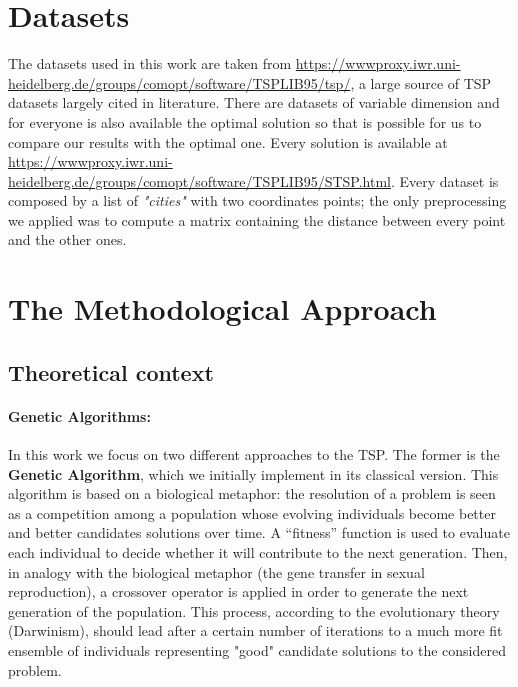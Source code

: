 \section{Datasets}
The datasets used in this work are taken from  \url{https://wwwproxy.iwr.uni-heidelberg.de/groups/comopt/software/TSPLIB95/tsp/}, a large source of TSP datasets largely cited in literature. 
There are datasets of variable dimension and for everyone is also available the optimal solution so that is possible for us to compare our results with the optimal one.
Every solution is available at \url{https://wwwproxy.iwr.uni-heidelberg.de/groups/comopt/software/TSPLIB95/STSP.html}.
Every dataset is composed by a list of \textit{"cities"} with two coordinates points; the only preprocessing we applied was to compute a matrix containing the distance between every point and the other ones.
\section{The Methodological Approach}

\subsection{Theoretical context}
\paragraph{Genetic Algorithms:}
In this work we focus on two different approaches to the TSP.
The former is the \textbf{Genetic Algorithm}, which we initially implement in its classical version.
This algorithm is based on a biological metaphor: the resolution of a problem is seen as a competition among a population whose evolving individuals become better and better candidates solutions over time. 
A “fitness” function is used to evaluate each individual to decide whether it will contribute to the next
generation. 
Then, in analogy with the biological metaphor (the gene transfer in sexual reproduction), a crossover operator is applied in order to generate the next generation of the population.
This process, according to the evolutionary theory (Darwinism), should lead after a certain number of iterations to a much more fit ensemble of individuals representing "good" candidate solutions to the considered problem.

